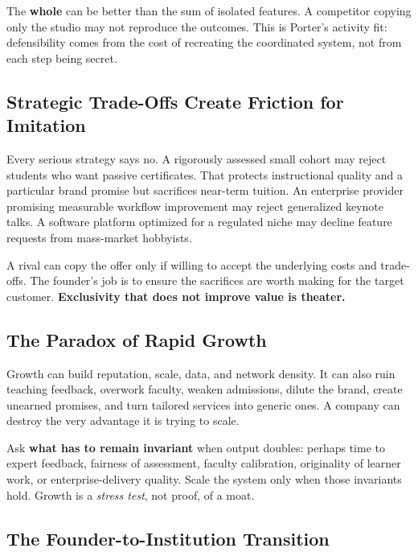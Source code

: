 The \textbf{whole} can be better than the sum of isolated features. A competitor copying only the studio may not reproduce the outcomes. This is Porter's activity fit: defensibility comes from the cost of recreating the coordinated system, not from each step being secret.

\subsection{Strategic Trade-Offs Create Friction for Imitation}
\label{sec:strategic_tradeoffs_friction_imitation}

Every serious strategy says no. A rigorously assessed small cohort may reject students who want passive certificates. That protects instructional quality and a particular brand promise but sacrifices near-term tuition. An enterprise provider promising measurable workflow improvement may reject generalized keynote talks. A software platform optimized for a regulated niche may decline feature requests from mass-market hobbyists.

A rival can copy the offer only if willing to accept the underlying costs and trade-offs. The founder's job is to ensure the sacrifices are worth making for the target customer. \textbf{Exclusivity that does not improve value is theater.}

\subsection{The Paradox of Rapid Growth}
\label{sec:paradox_of_rapid_growth}

Growth can build reputation, scale, data, and network density. It can also ruin teaching feedback, overwork faculty, weaken admissions, dilute the brand, create unearned promises, and turn tailored services into generic ones. A company can destroy the very advantage it is trying to scale.

Ask \textbf{what has to remain invariant} when output doubles: perhaps time to expert feedback, fairness of assessment, faculty calibration, originality of learner work, or enterprise-delivery quality. Scale the system only when those invariants hold. Growth is a \textit{stress test}, not proof, of a moat.

\subsection{The Founder-to-Institution Transition}
\label{sec:founder_to_institution_transition}

